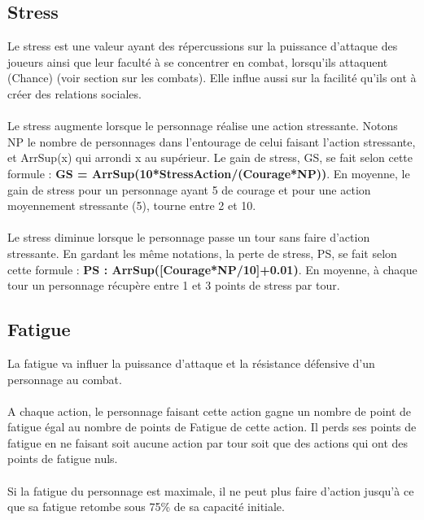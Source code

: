 \subsection{Stress}
Le stress est une valeur ayant des répercussions sur la puissance d'attaque des joueurs ainsi que leur faculté à se concentrer en combat, lorsqu'ils attaquent (Chance) (voir section sur les combats). Elle influe aussi sur la facilité qu'ils ont à créer des relations sociales.
\\\\
Le stress augmente lorsque le personnage réalise une action stressante. Notons NP le nombre de personnages dans l'entourage de celui faisant l'action stressante, et ArrSup(x) qui arrondi x au supérieur. Le gain de stress, GS, se fait selon cette formule : \textbf{GS = ArrSup(10*StressAction/(Courage*NP))}. En moyenne, le gain de stress pour un personnage ayant 5 de courage et pour une action moyennement stressante (5), tourne entre 2 et 10.
\\\\
Le stress diminue lorsque le personnage passe un tour sans faire d'action stressante. En gardant les même notations, la perte de stress, PS, se fait selon cette formule : \textbf{PS : ArrSup([Courage*NP/10]+0.01)}. En moyenne, à chaque tour un personnage récupère entre 1 et 3 points de stress par tour.
\subsection{Fatigue}
La fatigue va influer la puissance d'attaque et la résistance défensive d'un personnage au combat.
\\\\
A chaque action, le personnage faisant cette action gagne un nombre de point de fatigue égal au nombre de points de Fatigue de cette action. Il perds ses points de fatigue en ne faisant soit aucune action par tour soit que des actions qui ont des points de fatigue nuls.
\\\\
Si la fatigue du personnage est maximale, il ne peut plus faire d'action jusqu'à ce que sa fatigue retombe sous 75\% de sa capacité initiale.
